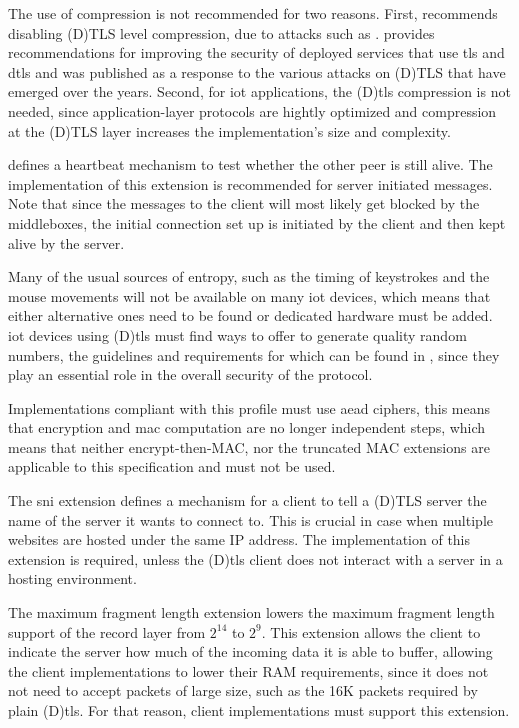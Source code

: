 \documentclass{llncs}
\begin{document}
The use of compression is not recommended for two reasons. First, \cite{RFC7525}
recommends disabling (D)TLS level compression, due to attacks such as \cite{Microsof72:online}.
 provides recommendations for improving the security of deployed services
that use \gls{tls} and \gls{dtls} and was published as a response to the various
attacks on (D)TLS that have emerged over the years. Second, for \gls{iot} applications,
the (D)\gls{tls} compression is not needed, since application-layer protocols are hightly
optimized and compression at the (D)TLS layer increases the implementation's size and complexity.

 defines a heartbeat mechanism to test whether the other peer
is still alive. The implementation of this extension is recommended for server
initiated messages. Note that since the messages to the client will most likely
get blocked by the middleboxes, the initial connection set up is initiated by the
client and then kept alive by the server.

Many of the usual sources of entropy, such as the timing of keystrokes and the
mouse movements will not be available on many \gls{iot} devices, which means that
either alternative ones need to be found or dedicated hardware must be added.
\gls{iot} devices using (D)\gls{tls} must find ways to offer to generate quality
random numbers, the guidelines and requirements for which can be found in \cite{rfc4086},
since they play an essential role in the overall security of the protocol.

Implementations compliant with this profile must use \gls{aead} ciphers, this means
that encryption and \gls{mac} computation are no longer independent steps, which means
that neither encrypt-then-MAC\cite{RFC7366}, nor the truncated MAC\cite{RFC6066} extensions are applicable
to this specification and must not be used.

The \gls{sni} extension\cite{RFC6066} defines a mechanism for a client to
tell a (D)TLS server the name of the server it wants to connect to. This is
crucial in case when multiple websites are hosted under the same IP address.
The implementation of this extension is required, unless the (D)\gls{tls}
client does not interact with a server in a hosting environment.

The maximum fragment length extension\cite{RFC6066} lowers the maximum fragment
length support of the record layer from $2^14$ to $2^9$. This extension allows
the client to indicate the server how much of the incoming data it is able to buffer,
allowing the client implementations to lower their RAM requirements, since it does not
not need to accept packets of large size, such as the 16K packets required by
plain (D)\gls{tls}. For that reason, client implementations must support this
extension.
\end{document}
